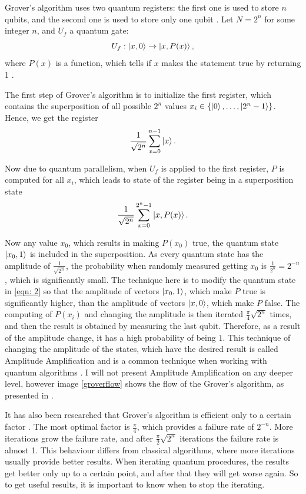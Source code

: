 \documentclass[english,oneside,openright]{UH_DS_report}
\begin{document}
Grover's algorithm uses two quantum registers: the first one is used to store $n$ qubits, and the second one is used to store only one qubit \cite{lavor2003grover}. Let $N = 2^{n}$ for some integer $n$, and $U_{f}$ a quantum gate:
\[U_{f} : \ket{x, 0} \rightarrow \ket{x, P(x)},\]
where $P(x)$ is a function, which tells if $x$ makes the statement true by returning 1 \cite{introtoqc}.

The first step of Grover's algorithm is to initialize the first register, which contains the superposition of all possible $2^{n}$ values $x_{i} \in \{\ket{0}, \ldots, \ket{2^{n} - 1}\}$. Hence, we get the register
\begin{equation}
\label{eqn: 1}
    \frac{1}{\sqrt{2^{n}}}\sum_{x = 0}^{n - 1}\ket{x} .
\end{equation}

Now due to quantum parallelism, when $U_{f}$ is applied to the first register, $P$ is computed for all $x_{i}$, which leads to state of the register being in a superposition state
\begin{equation}
\label{eqn: 2}
\frac{1}{\sqrt{2^{n}}}\sum_{x = 0}^{2^{n} - 1}\ket{x, P(x)}.    
\end{equation}

Now any value $x_{0}$, which results in making $P(x_{0})$ true, the quantum state $\ket{x_{0}, 1}$ is included in the superposition. As every quantum state has the amplitude of $\frac{1}{\sqrt{2^{n}}}$, the probability when randomly measured getting $x_0$ is $\frac{1}{2^{n}} = 2^{-n}$, which is significantly small. The technique here is to modify the quantum state in \ref{eqn: 2} so that the amplitude of vectors $\ket{x_{0}, 1}$, which make $P$ true is significantly higher, than the amplitude of vectors $\ket{x, 0}$, which make $P$ false. The computing of $P(x_{i})$ and changing the amplitude is then iterated $\frac{\pi}{4} \sqrt{2^{n}}$ times, and then the result is obtained by measuring the last qubit. Therefore, as a result of the amplitude change, it has a high probability of being $1$. This technique of changing the amplitude of the states, which have the desired result is called Amplitude Amplification and is a common technique when working with quantum algorithms \cite{lavor2003grover}. I will not present Amplitude Amplification on any deeper level, however image \ref{groverflow} shows the flow of the Grover's algorithm, as presented in \cite{zhang2020recent}.

It has also been researched that Grover's algorithm is efficient only to a certain factor \cite{introtoqc}. The most optimal factor is $\frac{\pi}{4}$, which provides a failure rate of $2^{-n}$. More iterations grow the failure rate, and after $\frac{\pi}{2}\sqrt{2^{n}}$ iterations the failure rate is almost 1. This behaviour differs from classical algorithms, where more iterations usually provide better results. When iterating quantum procedures, the results get better only up to a certain point, and after that they will get worse again. So to get useful results, it is important to know when to stop the iterating.
\end{document}
